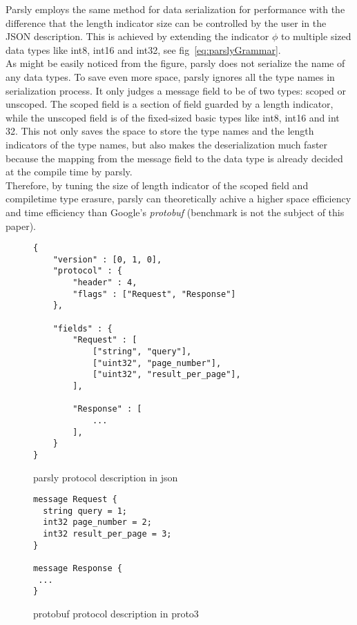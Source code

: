\documentclass{article}
\begin{document}
Parsly employs the same method for data serialization for performance with the difference that the length indicator size can be controlled by the user in the JSON description. This is achieved by extending the indicator $\phi$ to multiple sized data types like int8, int16 and int32, see fig~\ref{eq:parslyGrammar}. \\

As might be easily noticed from the figure, parsly does not serialize the name of any data types. To save even more space, parsly ignores all the type names in serialization process. It only judges a message field to be of two types: scoped or unscoped. The scoped field is a section of field guarded by a length indicator, while the unscoped field is of the fixed-sized basic types like int8, int16 and int 32. This not only saves the space to store the type names and the length indicators of the type names, but also makes the deserialization much faster because the mapping from the message field to the data type is already decided at the compile time by parsly.  \\

Therefore, by tuning the size of length indicator of the scoped field and compiletime type erasure, parsly can theoretically achive a higher space efficiency and time efficiency than Google's \textit{protobuf} (benchmark is not the subject of this paper). \\

\begin{figure}[b]
\lstset{language=c++}
\begin{lstlisting}
{
	"version" : [0, 1, 0],
	"protocol" : {
		"header" : 4,
		"flags" : ["Request", "Response"]
	},

	"fields" : {
		"Request" : [
			["string", "query"],
			["uint32", "page_number"],
			["uint32", "result_per_page"],
		],
	
		"Response" : [
			...
		],
	}
}
\end{lstlisting}
\caption{parsly protocol description in json}
\label{lst:parslyJson}
\end{figure}

\begin{figure}
\lstset{language=c++, showlines=true}
\begin{lstlisting}
message Request {
  string query = 1;
  int32 page_number = 2;
  int32 result_per_page = 3;
}

message Response {
 ...
}
\end{lstlisting}
\caption{protobuf protocol description in proto3}
\label{lst:proto3}
\end{figure}
\end{document}
